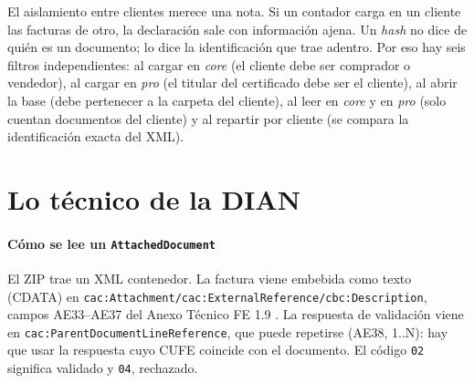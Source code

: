 \documentclass[conference,a4paper]{IEEEtran}
\newcommand{\cod}[1]{\texttt{\small #1}}
\begin{document}
El aislamiento entre clientes merece una nota. Si un contador carga en un cliente las facturas de otro, la declaración sale con información ajena. Un \emph{hash} no dice de quién es un documento; lo dice la identificación que trae adentro. Por eso hay seis filtros independientes: al cargar en \emph{core} (el cliente debe ser comprador o vendedor), al cargar en \emph{pro} (el titular del certificado debe ser el cliente), al abrir la base (debe pertenecer a la carpeta del cliente), al leer en \emph{core} y en \emph{pro} (solo cuentan documentos del cliente) y al repartir por cliente (se compara la identificación exacta del XML).

\section{Lo técnico de la DIAN}

\paragraph*{Cómo se lee un \cod{AttachedDocument}} El ZIP trae un XML contenedor. La factura viene embebida como texto (CDATA) en \nolinkurl{cac:Attachment/cac:ExternalReference/cbc:Description}, campos AE33--AE37 del Anexo Técnico FE 1.9 \cite{anexoFE19}. La respuesta de validación viene en \nolinkurl{cac:ParentDocumentLineReference}, que puede repetirse (AE38, 1..N): hay que usar la respuesta cuyo CUFE coincide con el documento. El código \cod{02} significa validado y \cod{04}, rechazado.
\end{document}
